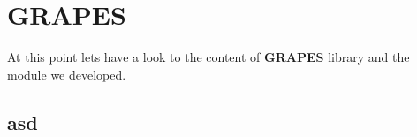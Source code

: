 \section{GRAPES}
\label{ch:grapes}
At this point lets have a look to the content of \textbf{GRAPES} library and the module we developed.

\subsection{asd}
\label{asd}
